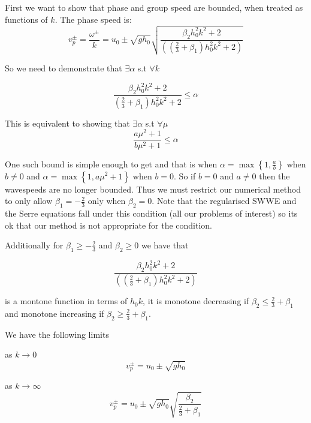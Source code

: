 \documentclass[10pt]{article}
\begin{document}
First we want to show that phase and group speed are bounded, when treated as functions of $k$.
The phase speed is:
\begin{equation}
v^\pm_p = \frac{\omega^\pm}{k}=u_0 \pm  \sqrt{gh_0} \sqrt{\dfrac{\beta_2 h_0^2 k^2 + 2}{\left( \left(\frac{2}{3} + \beta_1\right) h_0^2 k^2 + 2\right)} }
\end{equation} 

So we need to demonstrate that $\exists \alpha$ s.t  $\forall k$

\begin{equation}
\dfrac{\beta_2 h_0^2 k^2 + 2}{ \left(\frac{2}{3} + \beta_1\right) h_0^2 k^2 + 2} \le \alpha
\end{equation}

This is equivalent to showing that $\exists \alpha$ s.t  $\forall \mu$
\begin{equation}
\dfrac{a \mu^2 + 1}{ b\mu^2  + 1} \le \alpha
\end{equation}

One such bound is simple enough to get and that is when $\alpha = \max\left\lbrace 1,\frac{a}{b} \right\rbrace$ when $b \neq 0$ and $\alpha = \max\left\lbrace1, a \mu^2 + 1\right\rbrace$ when $b = 0$. So if $b = 0$ and $a \neq 0$ then the wavespeeds are no longer bounded. Thus we must restrict our numerical method to only allow $\beta_1 = -\frac{2}{3}$ only when $\beta_2 = 0$. Note that the regularised SWWE and the Serre equations fall under this condition (all our problems of interest) so its ok that our method is not appropriate for the condition.

Additionally for $\beta_1 \ge -\frac{2}{3}$ and $\beta_2 \ge 0$ we have that 

\begin{equation}
\dfrac{\beta_2 h_0^2 k^2 + 2}{\left( \left(\frac{2}{3} + \beta_1\right) h_0^2 k^2 + 2\right)}
\end{equation}

is a montone function in terms of $h_0k$, it is monotone decreasing if $\beta_2 \le \frac{2}{3} + \beta_1$ and monotone increasing if $\beta_2 \ge \frac{2}{3} + \beta_1$.
 
We have the following limits

as $k \rightarrow 0$
\begin{equation}
 v^\pm_p = u_0 \pm \sqrt{gh_0}
\end{equation} 

as $k \rightarrow \infty$
\begin{equation}
v^\pm_p = u_0 \pm \sqrt{gh_0} \sqrt{\dfrac{\beta_2}{\frac{2}{3} + \beta_1}}
\end{equation}
\end{document}
